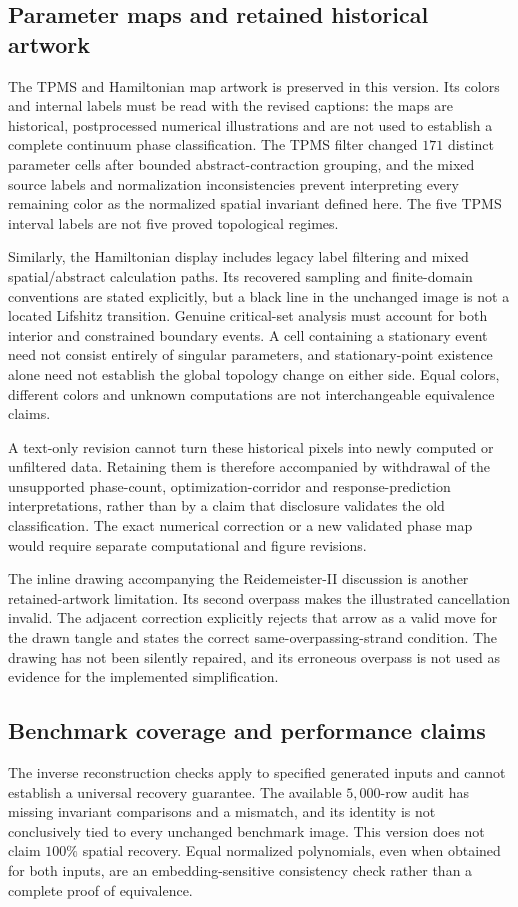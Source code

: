 \subsection{Parameter maps and retained historical artwork}
\label{supp:limitations_maps}
The TPMS and Hamiltonian map artwork is preserved in this version. Its colors and internal labels must be read with the revised captions: the maps are historical, postprocessed numerical illustrations and are not used to establish a complete continuum phase classification. The TPMS filter changed $171$ distinct parameter cells after bounded abstract-contraction grouping, and the mixed source labels and normalization inconsistencies prevent interpreting every remaining color as the normalized spatial invariant defined here. The five TPMS interval labels are not five proved topological regimes.

Similarly, the Hamiltonian display includes legacy label filtering and mixed spatial/abstract calculation paths. Its recovered sampling and finite-domain conventions are stated explicitly, but a black line in the unchanged image is not a located Lifshitz transition. Genuine critical-set analysis must account for both interior and constrained boundary events. A cell containing a stationary event need not consist entirely of singular parameters, and stationary-point existence alone need not establish the global topology change on either side. Equal colors, different colors and unknown computations are not interchangeable equivalence claims.

A text-only revision cannot turn these historical pixels into newly computed or unfiltered data. Retaining them is therefore accompanied by withdrawal of the unsupported phase-count, optimization-corridor and response-prediction interpretations, rather than by a claim that disclosure validates the old classification. The exact numerical correction or a new validated phase map would require separate computational and figure revisions.

The inline drawing accompanying the Reidemeister-II discussion is another retained-artwork limitation. Its second overpass makes the illustrated cancellation invalid. The adjacent correction explicitly rejects that arrow as a valid move for the drawn tangle and states the correct same-overpassing-strand condition. The drawing has not been silently repaired, and its erroneous overpass is not used as evidence for the implemented simplification.

\subsection{Benchmark coverage and performance claims}
\label{supp:limitations_performance}
The inverse reconstruction checks apply to specified generated inputs and cannot establish a universal recovery guarantee. The available $5{,}000$-row audit has missing invariant comparisons and a mismatch, and its identity is not conclusively tied to every unchanged benchmark image. This version does not claim $100\%$ spatial recovery. Equal normalized polynomials, even when obtained for both inputs, are an embedding-sensitive consistency check rather than a complete proof of equivalence.

